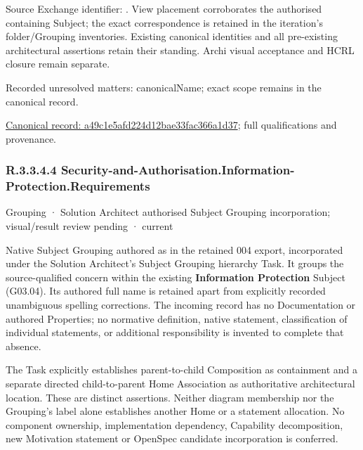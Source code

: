 Source Exchange identifier: \texttt{}. View placement corroborates
the authorised containing Subject; the exact correspondence is retained in the
iteration's folder/Grouping inventories. Existing canonical identities and all
pre-existing architectural assertions retain their standing. Archi visual
acceptance and HCRL closure remain separate.


{\small Recorded unresolved matters: canonicalName; exact scope remains in the canonical record.}\par
{\footnotesize \href{../../../../continuum/grouping/a49c1e5afd224d12bae33fac366a1d37.md}{Canonical record: a49c1e5afd224d12bae33fac366a1d37}; full qualifications and provenance.}\par
\subsubsection*{R.3.3.4.4 Security-and-Authorisation.Information-Protection.Requirements}
\label{navigation:R.3.3.4.4}

\label{element:e84139e878c740ab81c558cbc7ec6548}
{\small Grouping · Solution Architect authorised Subject Grouping incorporation; visual/result review pending · current}\par

Native Subject Grouping authored as \texttt{} in the retained 004 export,
incorporated under the Solution Architect's Subject Grouping hierarchy Task.
It groups the source-qualified \texttt{} concern within
the existing \textbf{Information Protection} Subject (G03.04). Its authored full name
is retained apart from explicitly recorded unambiguous spelling corrections.
The incoming record has no Documentation or authored Properties; no normative
definition, native statement, classification of individual statements, or
additional responsibility is invented to complete that absence.



The Task explicitly establishes parent-to-child Composition as containment and
a separate directed child-to-parent Home Association as authoritative architectural
location. These are distinct assertions. Neither diagram membership nor the
Grouping's label alone establishes another Home or a statement allocation.
No component ownership, implementation dependency, Capability decomposition,
new Motivation statement or OpenSpec candidate incorporation is conferred.




